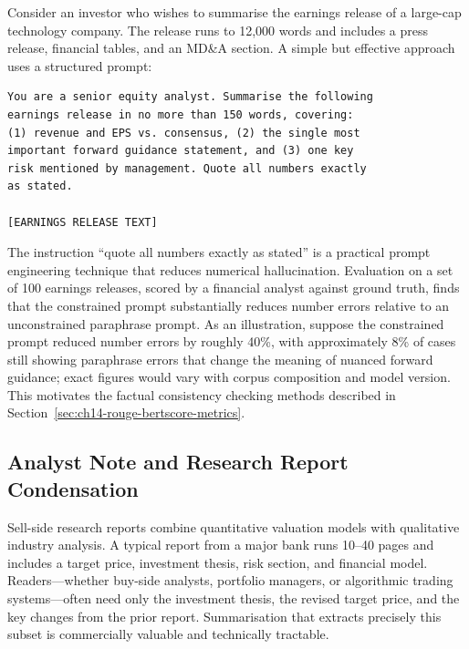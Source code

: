\begin{example}
\label{ex:earnings-gpt4}
Consider an investor who wishes to summarise the earnings release of a large-cap
technology company. The release runs to 12,000 words and includes a press release,
financial tables, and an MD\&A section. A simple but effective approach uses a
structured prompt:

\begin{verbatim}
You are a senior equity analyst. Summarise the following
earnings release in no more than 150 words, covering:
(1) revenue and EPS vs. consensus, (2) the single most
important forward guidance statement, and (3) one key
risk mentioned by management. Quote all numbers exactly
as stated.

[EARNINGS RELEASE TEXT]
\end{verbatim}

The instruction ``quote all numbers exactly as stated'' is a practical prompt
engineering technique that reduces numerical hallucination. Evaluation on a set
of 100 earnings releases, scored by a financial analyst against ground truth,
finds that the constrained prompt substantially reduces number errors relative to an
unconstrained paraphrase prompt. As an illustration, suppose the constrained prompt
reduced number errors by roughly 40\%, with approximately 8\% of cases still showing
paraphrase errors that change the meaning of nuanced forward guidance; exact figures
would vary with corpus composition and model version. This motivates the factual
consistency checking methods described in
Section~\ref{sec:ch14-rouge-bertscore-metrics}.
\end{example}

\subsection{Analyst Note and Research Report Condensation}
\label{sec:ch14-analyst-note-condensation}

Sell-side research reports combine quantitative valuation models with qualitative
industry analysis. A typical report from a major bank runs 10--40 pages and includes
a target price, investment thesis, risk section, and financial model. Readers---whether
buy-side analysts, portfolio managers, or algorithmic trading systems---often need only
the investment thesis, the revised target price, and the key changes from the prior
report. Summarisation that extracts precisely this subset is commercially valuable and
technically tractable.

